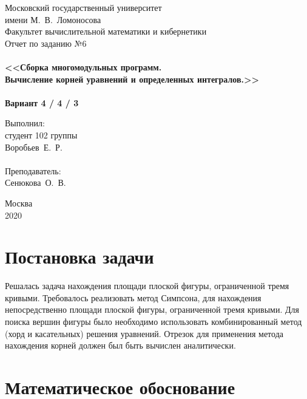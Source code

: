 \documentclass[a4paper,12pt,titlepage,finall]{article}
\begin{document}
\begin{titlepage}
    \begin{center}
    {\small \sc Московский государственный университет \\имени М.~В.~Ломоносова\\
    Факультет вычислительной математики и кибернетики\\}
    \vfill
    {\Large \sc Отчет по заданию №6}\\
    ~\\
    {\large \bf <<Сборка многомодульных программ. \\
    Вычисление корней уравнений и определенных интегралов.>>}\\ 
    ~\\
    {\large \bf Вариант 4 / 4 / 3}
    \end{center}
    \begin{flushright}
    \vfill {Выполнил:\\
    студент 102 группы\\
    Воробьев~Е.~Р.\\
    ~\\
    Преподаватель:\\
    Сенюкова~О.~В.}
    \end{flushright}
    \begin{center}
    \vfill
    {\small Москва\\2020}
    \end{center}
\end{titlepage}

\tableofcontents
\newpage

\section{Постановка задачи}

Решалась задача нахождения площади плоской фигуры, ограниченной тремя кривыми. Требовалось реализовать метод Симпсона, для нахождения непосредственно площади плоской фигуры, ограниченной тремя кривыми. Для поиска вершин фигуры было необходимо использовать комбинированный метод (хорд и касательных) решения уравнений. Отрезок для применения метода нахождения корней должен был быть вычислен аналитически.\par

\newpage

\section{Математическое обоснование}
\end{document}
